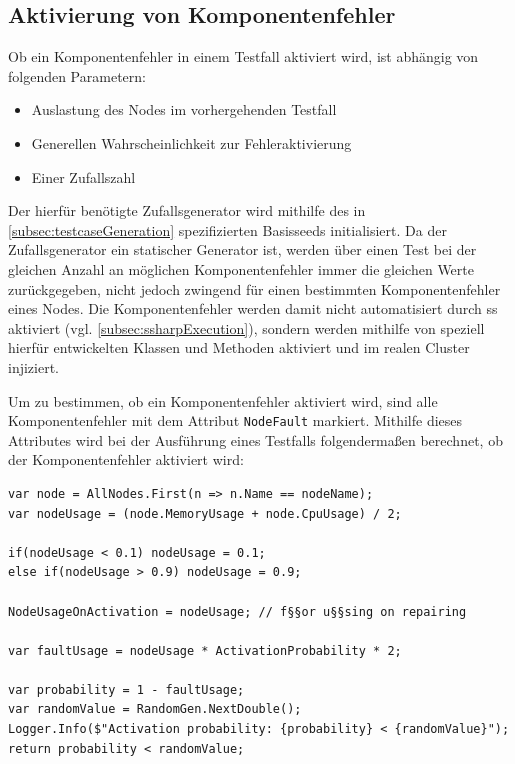 \subsection{Aktivierung von Komponentenfehler}
\label{subsec:faultActivation}

Ob ein Komponentenfehler in einem \gls{Testfall} aktiviert wird, ist abhängig von folgenden Parametern:

\begin{itemize}
    \item Auslastung des Nodes im vorhergehenden Testfall
    \item Generellen Wahrscheinlichkeit zur Fehleraktivierung
    \item Einer Zufallszahl
\end{itemize}

Der hierfür benötigte Zufallsgenerator wird mithilfe des in \cref{subsec:testcaseGeneration} spezifizierten Basisseeds initialisiert.
Da der Zufallsgenerator ein statischer Generator ist, werden über einen \gls{Test} bei der gleichen Anzahl an möglichen Komponentenfehler immer die gleichen Werte zurückgegeben, nicht jedoch zwingend für einen bestimmten Komponentenfehler eines Nodes.
Die Komponentenfehler werden damit nicht automatisiert durch \gls{ss} aktiviert (vgl. \cref{subsec:ssharpExecution}), sondern werden mithilfe von speziell hierfür entwickelten Klassen und Methoden aktiviert und im realen Cluster injiziert.

Um zu bestimmen, ob ein Komponentenfehler aktiviert wird, sind alle Komponentenfehler mit dem Attribut \texttt{NodeFault} markiert.
Mithilfe dieses Attributes wird bei der Ausführung eines Testfalls folgendermaßen berechnet, ob der Komponentenfehler aktiviert wird:

\begin{lstlisting}[label=lst:faultActivationCalc,style=cs,
caption={[Berechnung der Aktivierung von Komponentenfehlern]
    Berechnung der Aktivierung von Komponentenfehlern (zusammengefasst).}]
var node = AllNodes.First(n => n.Name == nodeName);
var nodeUsage = (node.MemoryUsage + node.CpuUsage) / 2;

if(nodeUsage < 0.1) nodeUsage = 0.1;
else if(nodeUsage > 0.9) nodeUsage = 0.9;

NodeUsageOnActivation = nodeUsage; // f§§or u§§sing on repairing

var faultUsage = nodeUsage * ActivationProbability * 2;

var probability = 1 - faultUsage;
var randomValue = RandomGen.NextDouble();
Logger.Info($"Activation probability: {probability} < {randomValue}");
return probability < randomValue;
\end{lstlisting}

